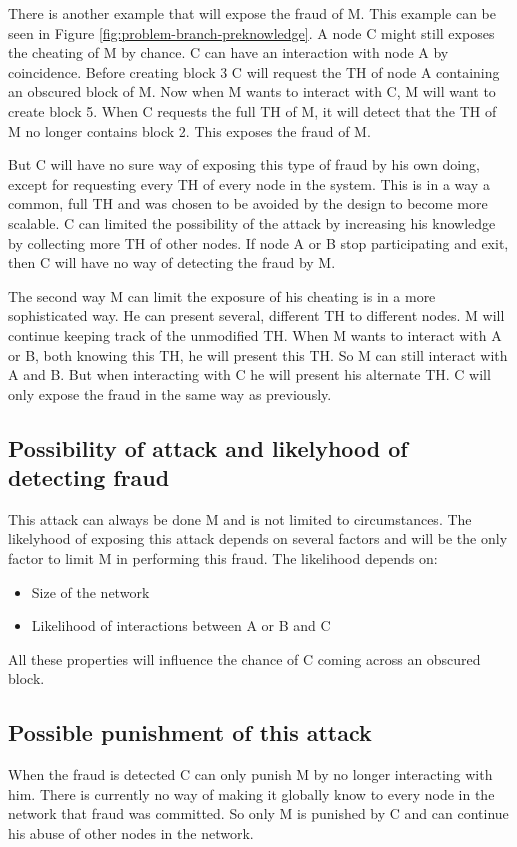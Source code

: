 There is another example that will expose the fraud of M.
This example can be seen in Figure \ref{fig:problem-branch-preknowledge}.
A node C might still exposes the cheating of M by chance.
C can have an interaction with node A by coincidence.
Before creating block 3 C will request the TH of node A containing an obscured block of M.
Now when M wants to interact with C, M will want to create block 5.
When C requests the full TH of M, it will detect that the TH of M no longer contains block 2.
This exposes the fraud of M.

But C will have no sure way of exposing this type of fraud by his own doing,
except for requesting every TH of every node in the system.
This is in a way a common, full TH and was chosen to be avoided by the design to become more scalable.
C can limited the possibility of the attack by increasing his knowledge by collecting more TH of other nodes.
If node A or B stop participating and exit,
then C will have no way of detecting the fraud by M.

The second way M can limit the exposure of his cheating is in a more sophisticated way.
He can present several, different TH to different nodes.
M will continue keeping track of the unmodified TH.
When M wants to interact with A or B, both knowing this TH, he will present this TH.
So M can still interact with A and B.
But when interacting with C he will present his alternate TH.
C will only expose the fraud in the same way as previously.

\subsection{Possibility of attack and likelyhood of detecting fraud}
This attack can always be done M and is not limited to circumstances.
The likelyhood of exposing this attack depends on several factors
and will be the only factor to limit M in performing this fraud.
The likelihood depends on:
\begin{itemize}
\item Size of the network
\item Likelihood of interactions between A or B and C
\end{itemize}

All these properties will influence the chance of C coming across an obscured block.

\subsection{Possible punishment of this attack}
When the fraud is detected C can only punish M by no longer interacting with him.
There is currently no way of making it globally know to every node in the network that fraud was committed.
So only M is punished by C and can continue his abuse of other nodes in the network.


